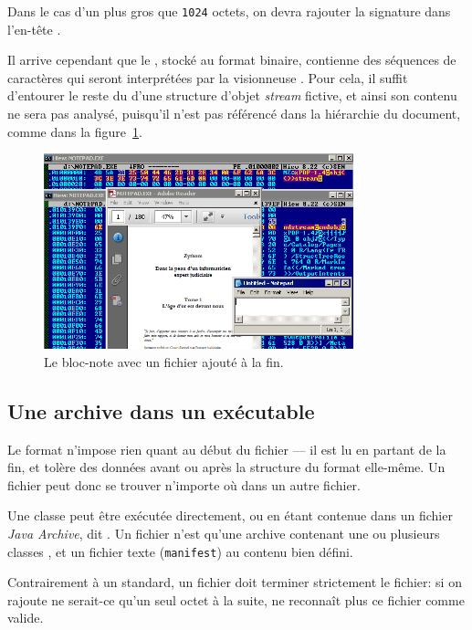 Dans le cas d'un \PE plus gros que \texttt{1024} octets, on devra rajouter la signature \PDF dans l'en-tête \PE.

Il arrive cependant que le \PE, stocké au format binaire, contienne des séquences de caractères qui seront interprétées par la visionneuse \PDF. Pour cela, il suffit d'entourer le reste du \PE d'une structure d'objet \emph{stream} fictive, et ainsi son contenu ne sera pas analysé, puisqu'il n'est pas référencé dans la hiérarchie du document, comme dans la figure~\ref{fig:albertini:pdfnotepad}.

\begin{figure}[ht]
  \centering
  \includegraphics[width=0.8\textwidth]{albertini/img/pdfnotepad}
  \caption{Le bloc-note \WIN avec un fichier \PDF ajouté à la fin.}
  \label{fig:albertini:pdfnotepad}
\end{figure}


\subsection{Une archive \ZIP dans un exécutable}
Le format \ZIP n'impose rien quant au début du fichier --- il est lu en partant de la fin, et tolère des données avant ou après la structure du format elle-même. Un fichier \ZIP peut donc se trouver n'importe où dans un autre fichier.

Une classe \JAVA peut être exécutée directement, ou en étant contenue dans un fichier {\em Java Archive}, dit \JAR.
Un fichier \JAR n'est qu'une archive \ZIP contenant une ou plusieurs classes \JAVA, et un fichier texte (\texttt{manifest}) au contenu bien défini.

Contrairement à un \ZIP standard, un fichier \JAR doit terminer strictement le fichier: si on rajoute ne serait-ce qu'un seul octet à la suite, \JAVA ne reconnaît plus ce fichier comme valide.

